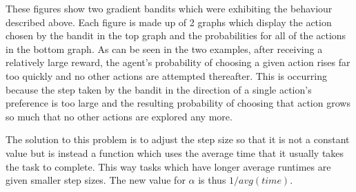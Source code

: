 These figures show two gradient bandits which were exhibiting the behaviour described above. Each figure is made up of 2 graphs which display the action chosen by the bandit in the top graph and the probabilities for all of the actions in the bottom graph. As can be seen in the two examples, after receiving a relatively large reward, the agent’s probability of choosing a given action rises far too quickly and no other actions are attempted thereafter. This is occurring because the step taken by the bandit in the direction of a single action’s preference is too large and the resulting probability of choosing that action grows so much that no other actions are explored any more. 

The solution to this problem is to adjust the step size so that it is not a constant value but is instead a function which uses the average time that it usually takes the task to complete. This way tasks which have longer average runtimes are given smaller step sizes. The new value for $\alpha$ is thus $1/avg(time)$.

